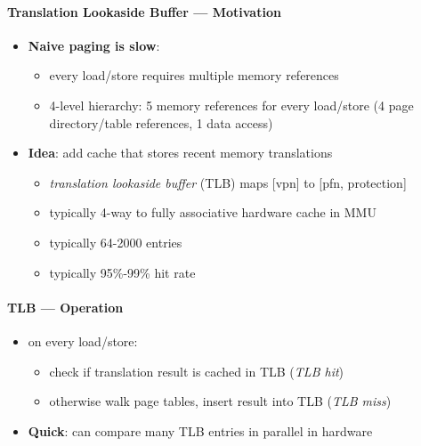 \paragraph{Translation Lookaside Buffer --- Motivation}
\begin{itemize}
  \item \textbf{Naive paging is slow}:
  \begin{itemize}
    \item every load/store requires multiple memory references
    \item 4-level hierarchy: 5 memory references for every load/store (4 page directory/table references, 1 data access)
  \end{itemize}
  \item \textbf{Idea}: add cache that stores recent memory translations
  \begin{itemize}
    \item \emph{translation lookaside buffer} (TLB) maps [vpn] to [pfn, protection]
    \item typically 4-way to fully associative hardware cache in MMU
    \item typically 64-2000 entries
    \item typically 95\%-99\% hit rate
  \end{itemize}
\end{itemize}

\paragraph{TLB --- Operation}
\begin{itemize}
  \item on every load/store:
  \begin{itemize}
    \item check if translation result is cached in TLB (\emph{TLB hit})
    \item otherwise walk page tables, insert result into TLB (\emph{TLB miss})
  \end{itemize}
  \item \textbf{Quick}: can compare many TLB entries in parallel in hardware
\end{itemize}

